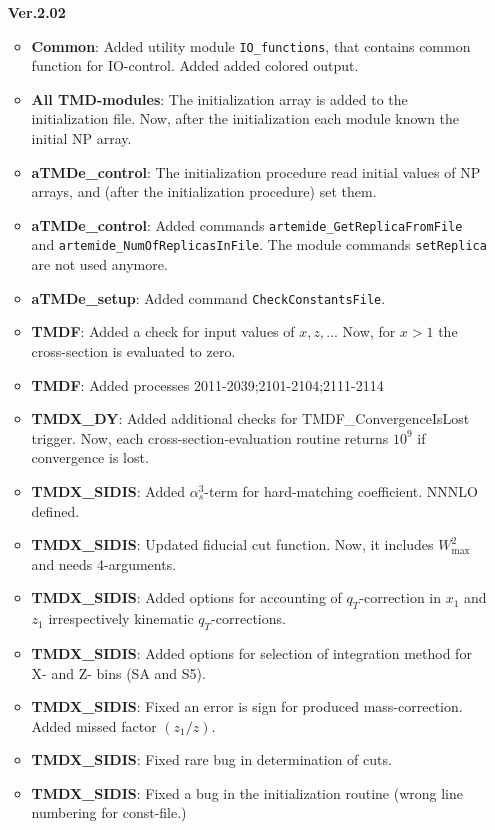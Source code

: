 \documentclass[prd,nofootinbib,eqsecnum,final]{revtex4}
\renewcommand{\(}{\left(}
\renewcommand{\)}{\right)}
\renewcommand{\[}{\left[}
\renewcommand{\]}{\right]}
\begin{document}
\begin{itemize}
\item[\textbf{Ver.2.02}]
\begin{itemize}	
	\item \textbf{Common}: Added utility module \texttt{IO\_functions}, that contains common function for IO-control. Added added colored output.
	\item \textbf{All TMD-modules}: The initialization array is added to the initialization file. Now, after the initialization each module known the initial NP array.
	\item \textbf{aTMDe\_control}: The initialization procedure read initial values of NP arrays, and (after the initialization procedure) set them.
	\item \textbf{aTMDe\_control}: Added commands \texttt{artemide\_GetReplicaFromFile} and \texttt{artemide\_NumOfReplicasInFile}. The module commands \texttt{setReplica} are not used anymore.
	\item \textbf{aTMDe\_setup}: Added command \texttt{CheckConstantsFile}.
	\item \textbf{TMDF}: Added a check for input values of $x,z,..$. Now, for $x>1$ the cross-section is evaluated to zero.
	\item \textbf{TMDF}: Added processes 2011-2039;2101-2104;2111-2114
	\item \textbf{TMDX\_DY}: Added additional checks for TMDF\_ConvergenceIsLost trigger. Now, each cross-section-evaluation routine returns $10^9$ if convergence is lost.
	\item \textbf{TMDX\_SIDIS}: Added $\alpha_s^3$-term for hard-matching coefficient. NNNLO defined.
	\item \textbf{TMDX\_SIDIS}: Updated fiducial cut function. Now, it includes $W^2_{\text{max}}$ and needs 4-arguments.
	\item \textbf{TMDX\_SIDIS}: Added options for accounting of $q_T$-correction in $x_1$ and $z_1$ irrespectively kinematic $q_T$-corrections.
	\item \textbf{TMDX\_SIDIS}: Added options for selection of integration method for X- and Z- bins (SA and S5).
	\item \textbf{TMDX\_SIDIS}: Fixed an error is sign for produced mass-correction. Added missed factor $(z_1/z)$.
	\item \textbf{TMDX\_SIDIS}: Fixed rare bug in determination of cuts.
	\item \textbf{TMDX\_SIDIS}: Fixed a bug in the initialization routine (wrong line numbering for const-file.)
\end{itemize}


\end{itemize}
\end{document}

